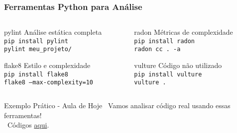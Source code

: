 \documentclass[aspectratio=169]{beamer}
\begin{document}
\begin{frame}
\frametitle{Ferramentas Python para Análise}
\begin{columns}
\begin{column}{0.5\textwidth}
\begin{block}{pylint}
\footnotesize
Análise estática completa\\
\texttt{pip install pylint}\\
\texttt{pylint meu\_projeto/}
\end{block}

\begin{block}{flake8}
\footnotesize
Estilo e complexidade\\
\texttt{pip install flake8}\\
\texttt{flake8 --max-complexity=10}
\end{block}
\end{column}

\begin{column}{0.5\textwidth}
\begin{block}{radon}
\footnotesize
Métricas de complexidade\\
\texttt{pip install radon}\\
\texttt{radon cc . -a}
\end{block}

\begin{block}{vulture}
\footnotesize
Código não utilizado\\
\texttt{pip install vulture}\\
\texttt{vulture .}
\end{block}
\end{column}
\end{columns}

\vspace{0.5cm}
\begin{alertblock}{Exemplo Prático - Aula de Hoje}
\footnotesize
\faCode \, Vamos analisar código real usando essas ferramentas! \\
\faGithub \, Códigos \href{https://github.com/fmarquesfilho/bpp-2025-2/blob/main/src/s4/}{aqui}.
\end{alertblock}
\end{frame}
\end{document}
